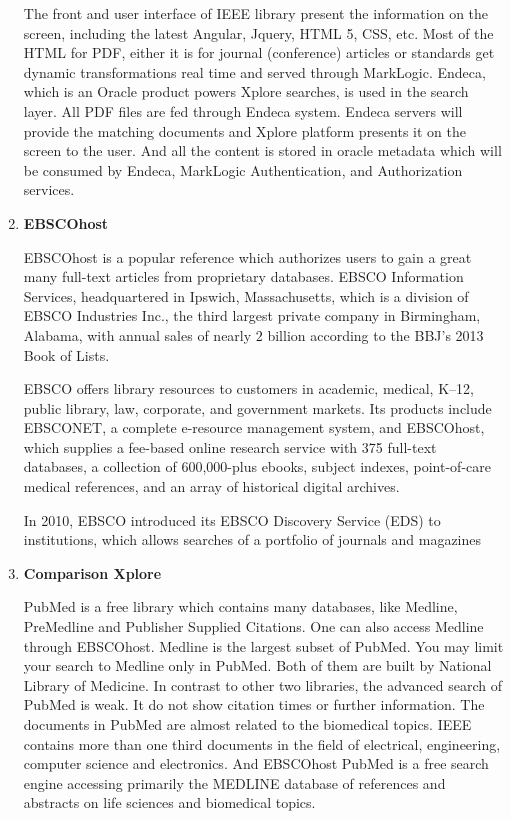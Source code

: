 \begin{enumerate}
	The front and user interface of IEEE library present the information on the screen, 
	including the latest Angular, Jquery, HTML 5, CSS, etc. 
	Most of the HTML for PDF, either it is for journal (conference) articles or standards get dynamic transformations real time and served through MarkLogic.
	Endeca, which is an Oracle product powers Xplore searches, is used in the search layer.
	All PDF files are fed through Endeca system.
	Endeca servers will provide the matching documents and Xplore platform presents it on the screen to the user.
	And all the content is stored in oracle metadata which will be consumed by Endeca, MarkLogic Authentication, and Authorization services.
	
	\item\textbf{EBSCOhost}
	\setlength{\parindent}{1em}

	EBSCOhost is a popular reference which authorizes users to gain a great many full-text articles from proprietary databases.
	EBSCO Information Services, headquartered in Ipswich, Massachusetts, 
    which is a division of EBSCO Industries Inc., 
    the third largest private company in Birmingham, Alabama, with annual sales of nearly $2$ billion according to the BBJ's 2013 Book of Lists.

    EBSCO offers library resources to customers in academic, medical, K–12,  
    public library, law, corporate, and government markets. 
	Its products include EBSCONET, a complete e-resource management system,
    and EBSCOhost, which supplies a fee-based online research 
    service with 375 full-text databases, a collection
    of 600,000-plus ebooks, subject indexes, point-of-care 
    medical references, and an array of historical digital archives.

    In 2010, EBSCO introduced its EBSCO Discovery Service (EDS) to institutions,
    which allows searches of a portfolio of journals and magazines

	
	\item\textbf{Comparison Xplore}
	\setlength{\parindent}{1em}
	
	PubMed is a free library which contains many databases, like Medline, PreMedline and Publisher Supplied Citations.
    One can also access Medline through EBSCOhost. 
    Medline is the largest subset of PubMed. 
    You may limit your search to Medline only in PubMed. 
    Both of them are built by National Library of Medicine. 
    In contrast to other two libraries, the advanced search of PubMed is weak. 
    It do not show citation times or further information.
    The documents in PubMed are almost related to the biomedical topics.
    IEEE contains more than one third documents in the field of electrical, engineering, computer science and electronics.
    And EBSCOhost PubMed is a free search engine accessing primarily the MEDLINE 
    database of references and abstracts on life sciences and biomedical topics. 
    

\end{enumerate}

